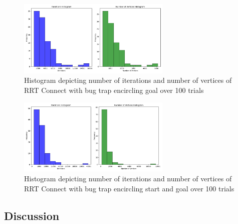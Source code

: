 \documentclass{article}
\begin{document}
\begin{figure}[H]
    \begin{center}
        \includegraphics[width=0.65\textwidth]{figures/hist_RRT_Connect_4.png}
    \end{center}
    \caption{Histogram depicting number of iterations and number of
    vertices of RRT Connect with bug trap encircling goal over 100
trials}\label{fig:hist_RRT_Connect_4}
\end{figure}
\begin{figure}[H]
    \begin{center}
        \includegraphics[width=0.65\textwidth]{figures/hist_RRT_Connect_5.png}
    \end{center}
    \caption{Histogram depicting number of iterations and number of
    vertices of RRT Connect with bug trap encircling start and goal over 100
trials}\label{fig:hist_RRT_Connect_5}
\end{figure}

\subsection{Discussion}\label{sub:Discussion 2} %
\end{document}
